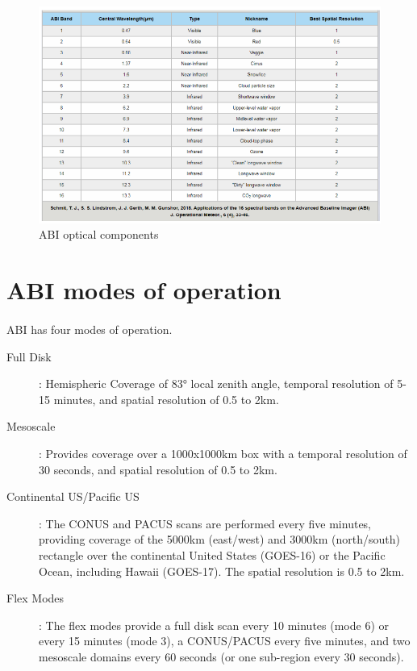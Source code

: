 \begin{figure}[H]
\begin{center}
\includegraphics[scale=0.8]{abi_band_image.png} %
\end{center}
\caption{ABI optical components}
\label{ABI optical components}%
\end{figure}
\section{ABI modes of operation}
\paragraph{}
ABI has four modes of operation.
\begin{description}
\item[Full Disk] : Hemispheric Coverage of 83° local zenith angle, temporal resolution of 5-15 minutes, and spatial resolution of 0.5 to 2km.
\item[ Mesoscale]: Provides coverage over a 1000x1000km box with a temporal resolution of 30 seconds, and spatial resolution of 0.5 to 2km.
\item[ Continental US/Pacific US]: The CONUS and PACUS scans are performed every five minutes, providing coverage of the 5000km (east/west) and 3000km (north/south) rectangle over the continental United States (GOES-16) or the Pacific Ocean, including Hawaii (GOES-17). The spatial resolution is 0.5 to 2km.
\item[ Flex Modes]: The flex modes provide a full disk scan every 10 minutes (mode 6) or every 15 minutes (mode 3), a CONUS/PACUS every five minutes, and two mesoscale domains every 60 seconds (or one sub-region every 30 seconds).
\end{description}

